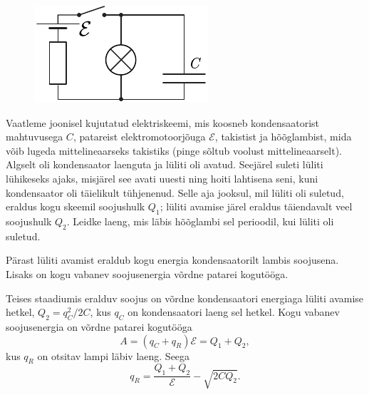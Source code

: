 
\begin{figure}
\vspace{-10pt}
\begin{center}
\includegraphics[width=\linewidth]{2018-v3g-09-LC-Q}
\par\end{center} 
\end{figure}

Vaatleme joonisel kujutatud elektriskeemi, mis koosneb kondensaatorist mahtuvusega $C$, patareist elektromotoorjõuga $\mathcal{E}$, takistist ja hõõglambist, mida võib lugeda mittelineaarseks takistiks (pinge sõltub voolust mittelineaarselt). Algselt oli kondensaator laenguta ja lüliti oli avatud. Seejärel suleti lüliti lühikeseks ajaks, misjärel see avati uuesti ning hoiti lahtisena seni, kuni kondensaator oli täielikult tühjenenud. Selle aja jooksul, mil lüliti oli suletud, eraldus kogu skeemil soojushulk $Q_1$; lüliti avamise järel eraldus täiendavalt veel soojushulk $Q_2$. Leidke laeng, mis läbis hõõglambi sel perioodil, kui lüliti oli suletud.

\hint
Pärast lüliti avamist eraldub kogu energia kondensaatorilt lambis soojusena. Lisaks on kogu vabanev soojusenergia võrdne patarei kogutööga.

\solu
Teises staadiumis eralduv soojus on võrdne kondensaatori energiaga lüliti avamise hetkel, $Q_2=q_C^2/2C$, kus $q_C$ on kondensaatori laeng sel hetkel. Kogu vabanev soojusenergia on võrdne patarei kogutööga
\[
A=(q_C+q_R)\mathcal E=Q_1+Q_2,
\]
kus $q_R$ on otsitav lampi läbiv laeng. Seega
\[
q_R=\frac{Q_1+Q_2}{\mathcal E}-\sqrt{2CQ_2}.
\]


